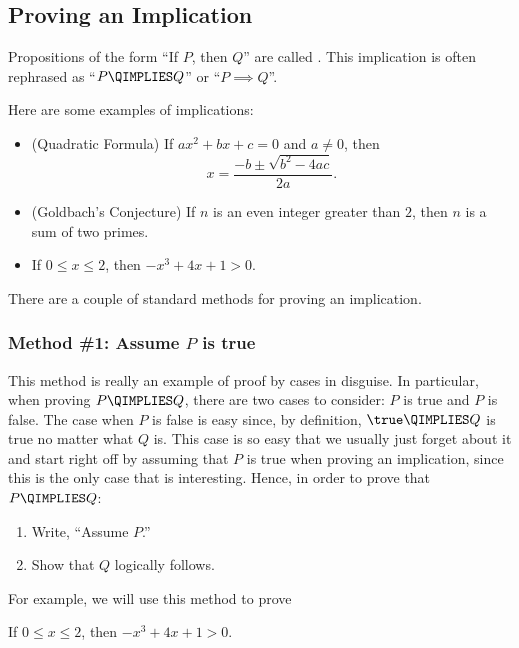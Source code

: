 \subsection{Proving an Implication}\label{sec:prove_implies}

Propositions of the form ``If $P$, then $Q$'' are called
.  This implication is often rephrased as ``$P
\QIMPLIES Q$'' or ``$P \implies Q$''.

Here are some examples of implications:
%
\begin{itemize}

\item (Quadratic Formula) If $a x^2 + b x + c = 0$ and $a \neq 0$,
then
\[
x = \frac{- b \pm \sqrt{b^2 - 4 a c}}{2a}.
\]

\item (Goldbach's Conjecture) If $n$ is an even integer greater than
$2$, then $n$ is a sum of two primes.

\item If $0 \leq x \leq 2$, then $-x^3 + 4x + 1 > 0$.

\end{itemize}
%
There are a couple of standard methods for proving an implication.

\subsubsection{Method \#1: Assume $P$ is true}

This method is really an example of proof by cases in disguise.  In
particular, when proving $P \QIMPLIES Q$, there are two cases to
consider: $P$ is true and $P$ is false.  The case when $P$ is false is
easy since, by definition, $\true \QIMPLIES Q$ is true no matter what
$Q$ is.  This case is so easy that we usually just forget about it and
start right off by assuming that $P$ is true when proving an
implication, since this is the only case that is interesting.  Hence,
in order to prove that $P \QIMPLIES Q$:
%
\begin{enumerate}
\item Write, ``Assume $P$.''
\item Show that $Q$ logically follows.
\end{enumerate}

For example, we will use this method to prove
\begin{theorem}\label{th:-x3+4x+1}
If $0 \leq x \leq 2$, then $-x^3 + 4x + 1 > 0$.
\end{theorem}

